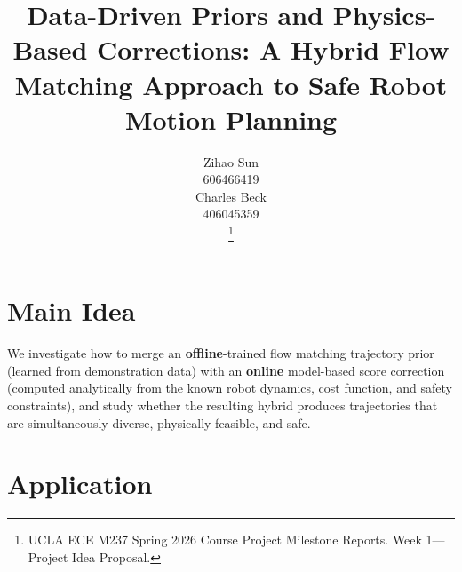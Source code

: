 \documentclass[letterpaper, 10 pt, conference]{ieeeconf}  %
\title{\LARGE \bf
Data-Driven Priors and Physics-Based Corrections: A Hybrid Flow Matching Approach to Safe Robot Motion Planning}
\author{ \parbox{3 in}{\centering Zihao Sun \\
        606466419}
        \hspace*{ 0.1 in}
        \parbox{2.5 in}{ \centering Charles Beck \\
        406045359
        }
\thanks{UCLA ECE M237 Spring 2026 Course Project Milestone Reports. Week 1---Project Idea Proposal.}
}
\begin{document}
\maketitle



\section{Main Idea}


We investigate how to merge an \textbf{offline}-trained flow matching trajectory prior (learned from demonstration data) with an \textbf{online} model-based score correction (computed analytically from the known robot dynamics, cost function, and safety constraints), and study whether the resulting hybrid produces trajectories that are simultaneously diverse, physically feasible, and safe.

\section{Application}

\end{document}
